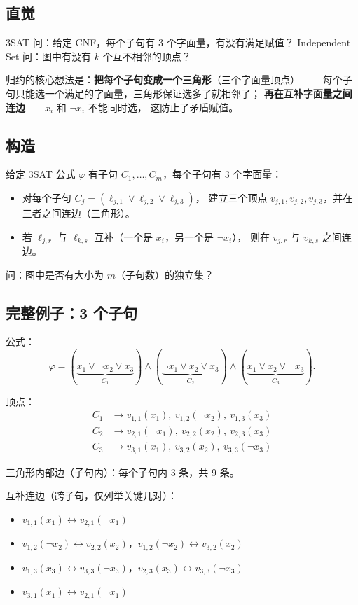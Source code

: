 \documentclass[UTF8,openany,12pt]{ctexbook}
\theoremstyle{remark}
\begin{document}
\subsection{直觉}

3SAT 问：给定 CNF，每个子句有 3 个字面量，有没有满足赋值？
Independent Set 问：图中有没有 $k$ 个互不相邻的顶点？

归约的核心想法是：\textbf{把每个子句变成一个三角形}（三个字面量顶点）——
每个子句只能选一个满足的字面量，三角形保证选多了就相邻了；
\textbf{再在互补字面量之间连边}——$x_i$ 和 $\neg x_i$ 不能同时选，
这防止了矛盾赋值。

\subsection{构造}

给定 3SAT 公式 $\varphi$ 有子句 $C_1, \ldots, C_m$，每个子句有 3 个字面量：
\begin{itemize}
  \item 对每个子句 $C_j = (\ell_{j,1} \vee \ell_{j,2} \vee \ell_{j,3})$，
        建立三个顶点 $v_{j,1}, v_{j,2}, v_{j,3}$，并在三者之间连边（三角形）。
  \item 若 $\ell_{j,r}$ 与 $\ell_{k,s}$ 互补（一个是 $x_i$，另一个是 $\neg x_i$），
        则在 $v_{j,r}$ 与 $v_{k,s}$ 之间连边。
\end{itemize}
问：图中是否有大小为 $m$（子句数）的独立集？

\subsection{完整例子：3 个子句}

公式：
\[
  \varphi = (\underbrace{x_1 \vee \neg x_2 \vee x_3}_{C_1})
            \wedge (\underbrace{\neg x_1 \vee x_2 \vee x_3}_{C_2})
            \wedge (\underbrace{x_1 \vee x_2 \vee \neg x_3}_{C_3}).
\]

顶点：
\begin{align*}
  C_1 &\to v_{1,1}(x_1),\ v_{1,2}(\neg x_2),\ v_{1,3}(x_3)\\
  C_2 &\to v_{2,1}(\neg x_1),\ v_{2,2}(x_2),\ v_{2,3}(x_3)\\
  C_3 &\to v_{3,1}(x_1),\ v_{3,2}(x_2),\ v_{3,3}(\neg x_3)
\end{align*}

三角形内部边（子句内）：每个子句内 3 条，共 9 条。

互补连边（跨子句，仅列举关键几对）：
\begin{itemize}
  \item $v_{1,1}(x_1) \leftrightarrow v_{2,1}(\neg x_1)$
  \item $v_{1,2}(\neg x_2) \leftrightarrow v_{2,2}(x_2)$，$v_{1,2}(\neg x_2) \leftrightarrow v_{3,2}(x_2)$
  \item $v_{1,3}(x_3) \leftrightarrow v_{3,3}(\neg x_3)$，$v_{2,3}(x_3) \leftrightarrow v_{3,3}(\neg x_3)$
  \item $v_{3,1}(x_1) \leftrightarrow v_{2,1}(\neg x_1)$
\end{itemize}
\end{document}
